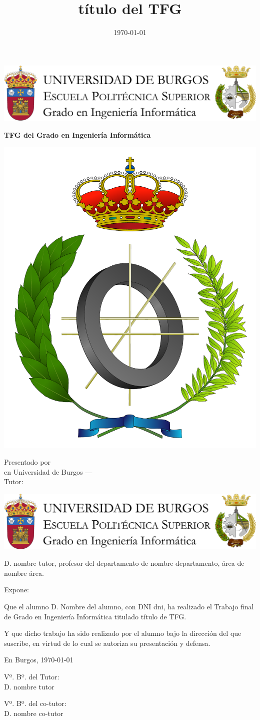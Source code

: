 \documentclass[a4paper,12pt,twoside]{memoir}
\title{título del TFG}
\author{\nombre}
\date{\today}
\makeatletter
\def\maketitle{
  \null
  \thispagestyle{empty}
\noindent\includegraphics[width=\textwidth]{cabecera}\vspace{1cm}%
  \vfill
  \colorbox{cpardoBox}{%
    \begin{minipage}{.8\textwidth}
      \vspace{.5cm}\Large
      \begin{center}
      \textbf{TFG del Grado en Ingeniería Informática}\vspace{.6cm}\\
      \textbf{\LARGE\@title{}}
      \end{center}
      \vspace{.2cm}
    \end{minipage}

  }%
  \hfill\begin{minipage}{.20\textwidth}
    \includegraphics[width=\textwidth]{escudoInfor}
  \end{minipage}
  \vfill
  \begin{center}%
  {%
    \noindent\LARGE
    Presentado por \@author{}\\ 
    en Universidad de Burgos --- \@date{}\\
    Tutor: \@tutor{}\\
  }%
  \end{center}%
  \null
  \cleardoublepage
  }
\newcommand{\nombre}{Nombre del alumno} %
\makeatother
\begin{document}
\maketitle


\newpage\null\thispagestyle{empty}\newpage


\thispagestyle{empty}


\noindent\includegraphics[width=\textwidth]{cabecera}\vspace{1cm}

\noindent D. nombre tutor, profesor del departamento de nombre departamento, área de nombre área.

\noindent Expone:

\noindent Que el alumno D. \nombre, con DNI dni, ha realizado el Trabajo final de Grado en Ingeniería Informática titulado título de TFG. 

\noindent Y que dicho trabajo ha sido realizado por el alumno bajo la dirección del que suscribe, en virtud de lo cual se autoriza su presentación y defensa.

\begin{center} %
En Burgos, {\large \today}
\end{center}

\vfill\vfill\vfill

\begin{minipage}{0.45\textwidth}
\begin{flushleft} %
Vº. Bº. del Tutor:\\[2cm]
D. nombre tutor
\end{flushleft}
\end{minipage}
\hfill
\begin{minipage}{0.45\textwidth}
\begin{flushleft} %
Vº. Bº. del co-tutor:\\[2cm]
D. nombre co-tutor
\end{flushleft}
\end{minipage}
\hfill

\vfill

\end{document}
